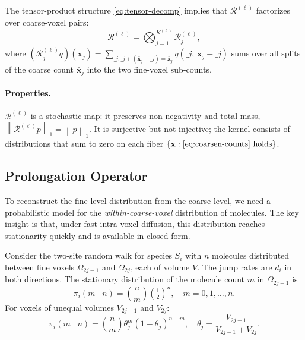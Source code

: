 \documentclass[review,onefignum,onetabnum]{siamart171218}
\newcommand{\bx}{\mathbf{x}}
\newcommand{\calR}{\mathcal{R}}
\newcommand{\norm}[1]{\left\|#1\right\|}
\begin{document}
The tensor-product structure \eqref{eq:tensor-decomp} implies
that $\calR^{(\ell)}$ factorizes over coarse-voxel pairs:
\begin{equation}
  \label{eq:restriction-factored}
  \calR^{(\ell)} = \bigotimes_{j=1}^{K^{(\ell)}} \calR_j^{(\ell)},
\end{equation}
where
$(\calR_j^{(\ell)} q)(\bar{\bx}_j)
  = \sum_{\bm_j : \bm_j + (\bar{\bx}_j - \bm_j) = \bar{\bx}_j} q(\bm_j,\, \bar{\bx}_j - \bm_j)$
sums over all splits of the coarse count $\bar{\bx}_j$ into the
two fine-voxel sub-counts.

\paragraph{Properties.}
$\calR^{(\ell)}$ is a stochastic map: it preserves non-negativity
and total mass, $\norm{\calR^{(\ell)} p}_1 = \norm{p}_1$.  It is
surjective but not injective; the kernel consists of distributions
that sum to zero on each fiber $\{\bx : \text{\eqref{eq:coarsen-counts} holds}\}$.

\subsection{Prolongation Operator}
\label{sec:prolongation}

To reconstruct the fine-level distribution from the coarse level,
we need a probabilistic model for the \emph{within-coarse-voxel}
distribution of molecules.  The key insight is that, under fast
intra-voxel diffusion, this distribution reaches stationarity
quickly and is available in closed form.

\begin{proposition}
  \label{prop:stationary-split}
  Consider the two-site random walk for species $S_i$ with $n$
  molecules distributed between fine voxels $\Omega_{2j-1}$ and
  $\Omega_{2j}$, each of volume $V$.  The jump rates are
  $d_i$ in both directions.  The stationary distribution of
  the molecule count $m$ in $\Omega_{2j-1}$ is
  \begin{equation}
    \label{eq:binomial-stat}
    \pi_i(m \mid n) = \binom{n}{m} \left(\tfrac{1}{2}\right)^n,
    \quad m = 0,1,\ldots,n.
  \end{equation}
  For voxels of unequal volumes $V_{2j-1}$ and $V_{2j}$:
  \begin{equation}
    \label{eq:binomial-stat-unequal}
    \pi_i(m \mid n) = \binom{n}{m} \theta_j^m (1-\theta_j)^{n-m},
    \quad \theta_j = \frac{V_{2j-1}}{V_{2j-1}+V_{2j}}.
  \end{equation}
\end{proposition}
\end{document}
